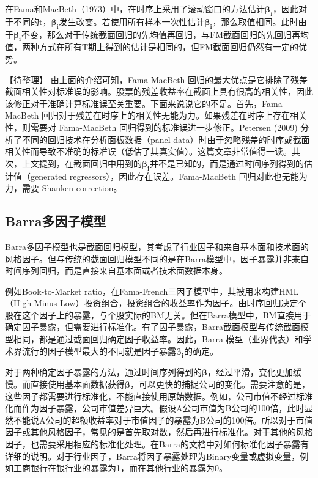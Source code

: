 \documentclass[11pt]{article}
\begin{document}
在Fama和MacBeth（1973）中，在时序上采用了滚动窗口的方法估计$\bm{\beta_i}$，因此对于不同的t，$\bm{\beta_i}$发生改变。若使用所有样本一次性估计$\bm{\beta_i}$，那么取值相同。此时由于$\bm{\beta_i}$不变，那么对于传统截面回归的先均值再回归，与FM截面回归的先回归再均值，两种方式在所有T期上得到的估计是相同的，但FM截面回归仍然有一定的优势。

【待整理】
由上面的介绍可知，Fama-MacBeth 回归的最大优点是它排除了残差截面相关性对标准误的影响。股票的残差收益率在截面上具有很高的相关性，因此该修正对于准确计算标准误至关重要。下面来说说它的不足。首先，Fama-MacBeth 回归对于残差在时序上的相关性无能为力。如果残差在时序上存在相关性，则需要对 Fama-MacBeth 回归得到的标准误进一步修正。Petersen (2009) 分析了不同的回归技术在分析面板数据（panel data）时由于忽略残差的时序或截面相关性而导致不准确的标准误（低估了其真实值）。这篇文章非常值得一读。其次，上文提到，在截面回归中用到的$\bm{\beta_i}$并不是已知的，而是通过时间序列得到的估计值（generated regressors），因此存在误差。Fama-MacBeth 回归对此也无能为力，需要 Shanken correction。

\subsection{Barra多因子模型}

Barra多因子模型也是截面回归模型，其考虑了行业因子和来自基本面和技术面的风格因子。但与传统的截面回归模型不同的是在Barra模型中，因子暴露并非来自时间序列回归，而是直接来自基本面或者技术面数据本身。

例如Book-to-Market ratio，在Fama-French三因子模型中，其被用来构建HML（High-Minus-Low）投资组合，投资组合的收益率作为因子。由时序回归决定个股在这个因子上的暴露，与个股实际的BM无关。但在Barra模型中，BM直接用于确定因子暴露，但需要进行标准化。有了因子暴露，Barra截面模型与传统截面模型相同，都是通过截面回归确定因子收益率。因此，Barra 模型（业界代表）和学术界流行的因子模型最大的不同就是因子暴露$\bm{\beta_i}$的确定。

对于两种确定因子暴露的方法，通过时间序列得到的$\bm{\beta}$，经过平滑，变化更加缓慢。而直接使用基本面数据获得$\bm{\beta}$，可以更快的捕捉公司的变化。需要注意的是，这些因子都需要进行标准化，不能直接使用原始数据。例如，公司市值不经过标准化而作为因子暴露，公司市值差异巨大。假设A公司市值为B公司的100倍，此时显然不能说A公司的超额收益率对于市值因子的暴露为B公司的100倍。所以对于市值因子或其他\uline{风格因子}，常见的是首先取对数，然后再进行标准化。对于其他的风格因子，也需要采用相应的标准化处理。在Barra的文档中对如何标准化因子暴露有详细的说明。对于行业因子，Barra将因子暴露处理为Binary变量或虚拟变量，例如工商银行在银行业的暴露为1，而在其他行业的暴露为0。
\end{document}
